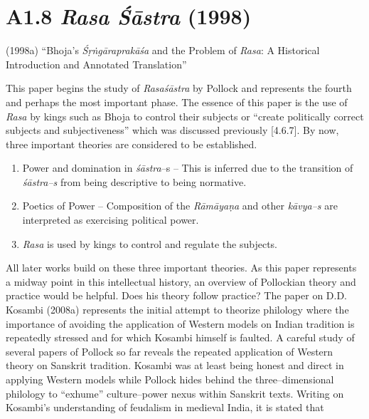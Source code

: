 \vspace{-.3cm}

\section*{A1.8 \textit{Rasa Śāstra} (1998)}

(1998a) “Bhoja's {\it Śṛṅgāraprakāśa} and the Problem of {\it Rasa}: A Historical Introduction and Annotated Translation”

This paper begins the study of \textit{Rasaśāstra} by Pollock and represents the fourth and perhaps the most important phase. The essence of this paper is the use of \textit{Rasa} by kings such as Bhoja to control their subjects or “create politically correct subjects and subjectiveness” which was discussed previously [4.6.7]. By now, three important theories are considered to be established.

\vspace{-.3cm}

\begin{enumerate}
\itemsep=0pt
\item Power and domination in \textit{śāstra}–s – This is inferred due to the transition of \textit{śāstra–s }from being descriptive to being normative.

 \item Poetics of Power – Composition of the \textit{Rāmāyaṇa} and other\textit{ kāvya–s }are interpreted as exercising political power.

 \item \textit{Rasa} is used by kings to control and regulate the subjects.

\end{enumerate}

\vspace{-.2cm}

All later works build on these three important theories. As this paper represents a midway point in this intellectual history, an overview of Pollockian theory and practice would be helpful. Does his theory follow practice? The paper on D.D. Kosambi (2008a) represents the initial attempt to theorize philology where the importance of avoiding the application of Western models on Indian tradition is repeatedly stressed and for which Kosambi himself is faulted. A careful study of several papers of Pollock so far reveals the repeated application of Western theory on Sanskrit tradition. Kosambi was at least being honest and direct in applying Western models while Pollock hides behind the three–dimensional philology to “exhume” culture–power nexus within Sanskrit texts. Writing on Kosambi’s understanding of feudalism in medieval India, it is stated that

